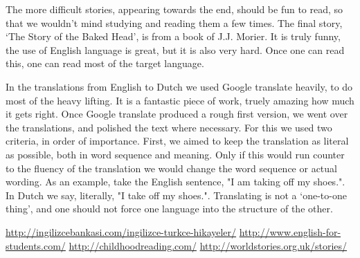 The more difficult stories, appearing towards the end, should be fun to read, so that we wouldn't mind studying and reading them a few times. The final story, `The Story of the Baked Head',  is from a book of J.J. Morier. It is truly funny, the use of  English language is great, but it is also very hard. Once one can read this, one can read most of the target language. 

In the translations from English to Dutch we used Google translate heavily, to do most of the heavy lifting. It is a fantastic piece of work, truely amazing how much it gets right. Once Google translate produced a rough first version, we went over the translations, and polished the text where necessary. For this we used two criteria, in order of importance. First, we aimed to keep the translation as literal as possible,  both in word sequence and meaning. Only if this would run counter to the fluency of the translation we would change the word sequence or actual wording. As an example, take the English sentence, "I am taking off my shoes.". In Dutch we say, literally, "I take off my shoes.". Translating is not a `one-to-one thing', and one should not force one language into the structure of the other.

\url{http://ingilizcebankasi.com/ingilizce-turkce-hikayeler/}
\url{http://www.english-for-students.com/}
\url{http://childhoodreading.com/}
\url{http://worldstories.org.uk/stories/}
